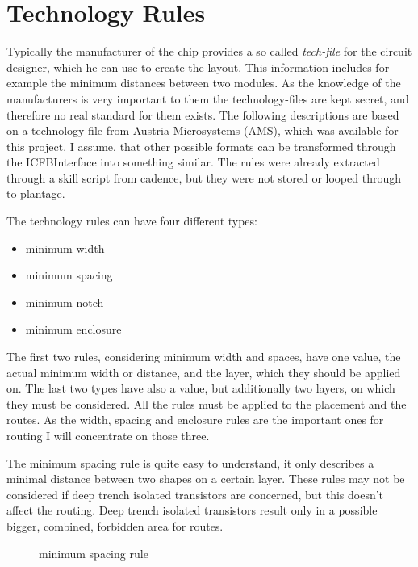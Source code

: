\section{Technology Rules}
Typically the manufacturer of the chip provides a so called \textit{tech-file} for the circuit designer, which he can use to create the layout. This information includes for example the minimum distances between two modules. As the knowledge of the manufacturers is very important to them the technology-files are kept secret, and therefore no real standard for them exists. The following descriptions are based on a technology file from Austria Microsystems (AMS), which was available for this project. I assume, that other possible formats can be transformed through the ICFBInterface into something similar. The rules were already extracted through a skill script from cadence, but they were not stored or looped through to plantage. 

The technology rules can have four different types:

\begin{itemize}
\item minimum width
\item minimum spacing
\item minimum notch
\item minimum enclosure
\end{itemize}

The first two rules, considering minimum width and spaces, have one value, the actual minimum width or distance, and the layer, which they should be applied on. The last two types have also a value, but additionally two layers, on which they must be considered. All the rules must be applied to the placement and the routes. As the width, spacing and enclosure rules are the important ones for routing I will concentrate on those three.

The minimum spacing rule  is quite easy to understand, it only describes a minimal distance between two shapes on a certain layer. These rules may not be considered if deep trench isolated transistors are concerned, but this doesn't affect the routing. Deep trench isolated transistors result only in a possible bigger, combined, forbidden area for routes.

\begin{figure}
	\centering
	
	\caption{minimum spacing rule}
	\label{fig:technology_rule_spacing}
\end{figure}

